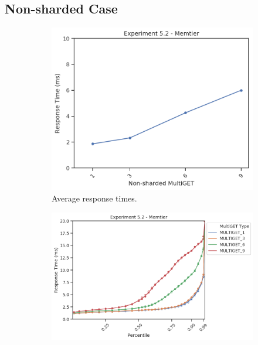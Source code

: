     \subsection{Non-sharded Case\label{subsec:5_nonsharded}}

        \begin{figure}
            \vspace*{-.5\baselineskip}
                \centering
            \begin{subfigure}[t!]{0.43\textwidth}
                \centering
                \includegraphics[width=\textwidth]{../data_analysis/figures/5-2_mt_response-time.png}
                \caption{Average response times.\label{fig:noshard_mt_rt}}
            \end{subfigure}
            \begin{subfigure}[t!]{0.56\textwidth}
                \centering
                \includegraphics[width=\textwidth]{../data_analysis/figures/5-2_mt_percentiles.png}

\end{subfigure}
\end{figure}
